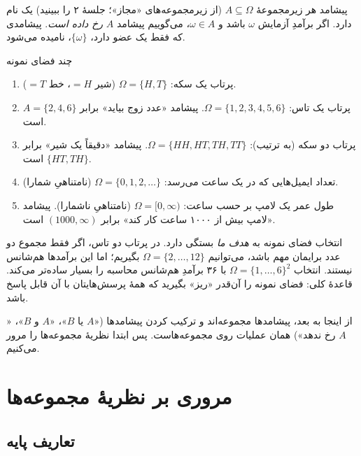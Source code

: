 \begin{definition}{پیشامد}
هر زیرمجموعهٔ $A\subseteq \Omega$ (از زیرمجموعه‌های «مجاز»؛ جلسهٔ ۲ را ببینید) یک  نام دارد. اگر برآمدِ آزمایش $\omega$ باشد و $\omega\in A$، می‌گوییم پیشامد $A$ \emph{رخ داده است}. پیشامدی که فقط یک عضو دارد، $\{\omega\}$،  نامیده می‌شود.
\end{definition}

\begin{example}{چند فضای نمونه}
\begin{enumerate}
  \item پرتاب یک سکه: $\Omega=\{H,T\}$ \;(شیر $=H$، خط $=T$).
  \item پرتاب یک تاس: $\Omega=\{1,2,3,4,5,6\}$. پیشامد «عدد زوج بیاید» برابر $A=\{2,4,6\}$ است.
  \item پرتاب دو سکه (به ترتیب): $\Omega=\{HH,HT,TH,TT\}$. پیشامد «دقیقاً یک شیر» برابر $\{HT,TH\}$ است.
  \item تعداد ایمیل‌هایی که در یک ساعت می‌رسد: $\Omega=\{0,1,2,\dots\}$ (نامتناهیِ شمارا).
  \item طول عمر یک لامپ بر حسب ساعت: $\Omega=[0,\infty)$ (نامتناهیِ ناشمارا). پیشامد «لامپ بیش از ۱۰۰۰ ساعت کار کند» برابر $(1000,\infty)$ است.
\end{enumerate}
\end{example}

\begin{note}
انتخاب فضای نمونه به \emph{هدف ما} بستگی دارد. در پرتاب دو تاس، اگر فقط مجموع دو عدد برایمان مهم باشد، می‌توانیم $\Omega=\{2,\dots,12\}$ بگیریم؛ اما این برآمدها هم‌شانس نیستند. انتخاب $\Omega=\{1,\dots,6\}^2$ با ۳۶ برآمدِ هم‌شانس محاسبه را بسیار ساده‌تر می‌کند. قاعدهٔ کلی: فضای نمونه را آن‌قدر «ریز» بگیرید که همهٔ پرسش‌هایتان با آن قابل پاسخ باشد.
\end{note}

از اینجا به بعد، پیشامدها مجموعه‌اند و ترکیب کردن پیشامدها («$A$ یا $B$»، «$A$ و $B$»، «$A$ رخ ندهد») همان عملیات روی مجموعه‌هاست. پس ابتدا نظریهٔ مجموعه‌ها را مرور می‌کنیم.

\section{مروری بر نظریهٔ مجموعه‌ها}

\subsection{تعاریف پایه}

